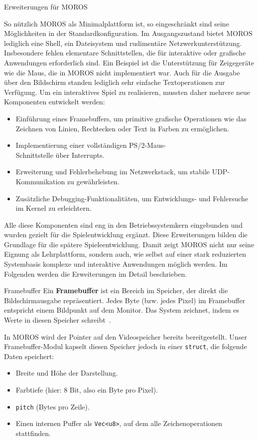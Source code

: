 \begin{section}{Erweiterungen für MOROS}

So nützlich MOROS als Minimalplattform ist, so eingeschränkt sind seine Möglichkeiten in der Standardkonfiguration.
Im Ausgangszustand bietet MOROS lediglich eine Shell, ein Dateisystem und rudimentäre Netzwerkunterstützung.
Insbesondere fehlen elementare Schnittstellen, die für interaktive oder grafische Anwendungen erforderlich sind.
Ein Beispiel ist die Unterstützung für Zeigegeräte wie die Maus, die in MOROS nicht implementiert war.
Auch für die Ausgabe über den Bildschirm standen lediglich sehr einfache Textoperationen zur Verfügung.
Um ein interaktives Spiel zu realisieren, mussten daher mehrere neue Komponenten entwickelt werden:
\begin{itemize}
    \item Einführung eines Framebuffers, um primitive grafische Operationen wie das Zeichnen von Linien, Rechtecken oder Text in Farben zu ermöglichen.
    \item Implementierung einer vollständigen PS/2-Maus-\\Schnittstelle über Interrupts.
    \item Erweiterung und Fehlerbehebung im Netzwerkstack, um stabile UDP-Kommunikation zu gewährleisten.
    \item Zusätzliche Debugging-Funktionalitäten, um Entwicklungs- und Fehlersuche im Kernel zu erleichtern.
\end{itemize}

Alle diese Komponenten sind eng in den Betriebssystemkern eingebunden und wurden gezielt für die Spielentwicklung ergänzt.
Diese Erweiterungen bilden die Grundlage für die spätere Spieleentwicklung.
Damit zeigt MOROS nicht nur seine Eignung als Lehrplattform, sondern auch, wie selbst auf einer stark reduzierten Systembasis
komplexe und interaktive Anwendungen möglich werden.
Im Folgenden werden die Erweiterungen im Detail beschrieben.

\begin{subsection}{Framebuffer}
Ein \textbf{Framebuffer} ist ein Bereich im Speicher, der direkt die Bildschirmausgabe repräsentiert.
Jedes Byte (bzw. jedes Pixel) im Framebuffer entspricht einem Bildpunkt auf dem Monitor.
Das System zeichnet, indem es Werte in diesen Speicher schreibt~\cite{osdev_framebuffer}.

In MOROS wird der Pointer auf den Videospeicher bereits bereitgestellt.
Unser Framebuffer-Modul kapselt diesen Speicher jedoch in einer \texttt{struct}, die folgende Daten speichert:
\begin{itemize}
    \item Breite und Höhe der Darstellung.
    \item Farbtiefe (hier: 8 Bit, also ein Byte pro Pixel).
    \item \texttt{pitch} (Bytes pro Zeile).
    \item Einen internen Puffer als \texttt{Vec<u8>}, auf dem alle Zeichenoperationen stattfinden.
\end{itemize}


\end{subsection}
\end{section}
